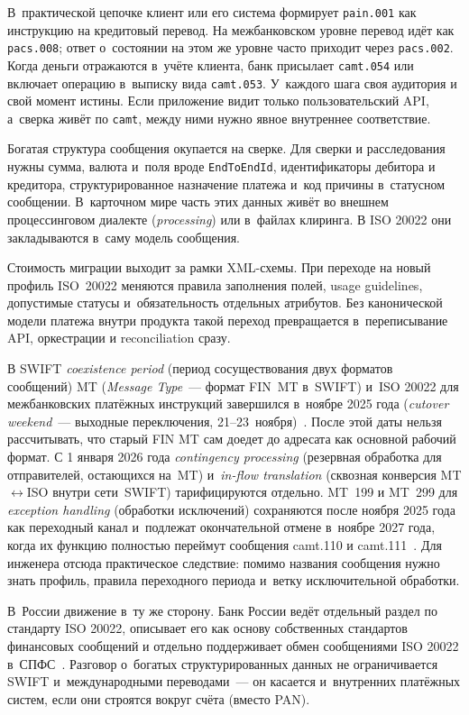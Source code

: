 В~практической цепочке клиент или его система
формирует \texttt{pain.001} как инструкцию на кредитовый перевод.
На межбанковском уровне перевод идёт как \texttt{pacs.008}; ответ
о~состоянии на этом же уровне часто приходит через \texttt{pacs.002}.
Когда деньги отражаются в~учёте клиента, банк присылает
\texttt{camt.054} или включает операцию в~выписку вида
\texttt{camt.053}. У~каждого шага своя аудитория и свой момент
истины. Если приложение видит только пользовательский API, а~сверка
живёт по \texttt{camt}, между ними нужно явное внутреннее
соответствие.

Богатая структура сообщения окупается на сверке. Для сверки
и расследования нужны сумма, валюта и~поля вроде \texttt{EndToEndId},
идентификаторы дебитора и кредитора, структурированное назначение
платежа и~код причины в~статусном сообщении. В~карточном мире часть
этих данных живёт во внешнем процессинговом диалекте (\textit{processing}) или в~файлах
клиринга. В ISO 20022 они закладываются в~саму модель сообщения.

Стоимость миграции выходит за рамки XML-схемы. При переходе
на новый профиль ISO~20022 меняются правила заполнения полей, usage
guidelines, допустимые статусы и~обязательность отдельных атрибутов.
Без канонической модели платежа внутри продукта такой переход
превращается в~переписывание API, оркестрации и reconciliation сразу.

В SWIFT \textit{coexistence period} (период сосуществования двух
форматов сообщений) MT (\textit{Message Type}~--- формат FIN~MT в~SWIFT)
и~ISO 20022 для межбанковских
платёжных инструкций завершился в~ноябре 2025 года (\textit{cutover
weekend}~--- выходные переключения, 21--23~ноября)~\cite{swift-iso20022-milestone,swift-iso20022-implementation}.
После этой даты нельзя рассчитывать, что старый FIN MT сам доедет
до адресата как основной рабочий формат. С 1 января 2026 года
\textit{contingency processing} (резервная обработка для отправителей,
остающихся на~MT) и~\textit{in-flow translation} (сквозная конверсия
MT$\leftrightarrow$ISO внутри сети~SWIFT)
тарифицируются отдельно. MT~199 и MT~299 для \textit{exception handling}
(обработки исключений)
сохраняются после ноября 2025 года как переходный канал и~подлежат
окончательной отмене в~ноябре 2027 года, когда их функцию полностью
переймут сообщения camt.110 и camt.111~\cite{swift-iso20022-implementation}.
Для инженера отсюда практическое следствие: помимо названия сообщения
нужно знать профиль, правила переходного периода и~ветку
исключительной обработки.

В~России движение в~ту же сторону. Банк России ведёт отдельный
раздел по стандарту ISO 20022, описывает его как основу собственных
стандартов финансовых сообщений и отдельно поддерживает обмен
сообщениями ISO 20022 в~СПФС~\cite{cbr-iso20022-album,cbr-spfs-iso20022}.
Разговор о~богатых структурированных данных не ограничивается SWIFT
и~международными переводами~--- он касается и~внутренних платёжных
систем, если они строятся вокруг счёта (вместо PAN).

